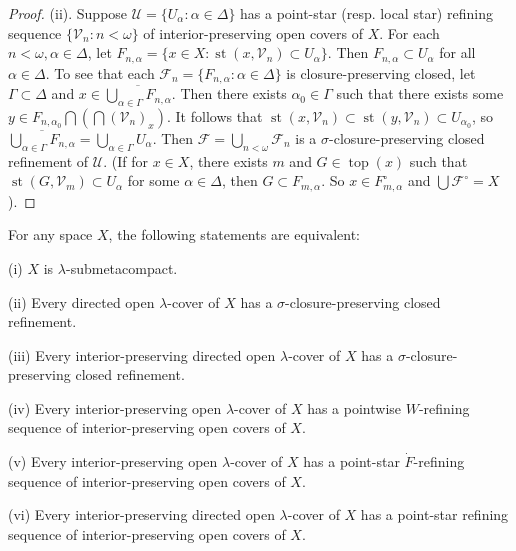 \documentclass[main.tex]{subfiles}
\begin{document}
\begin{proof}  
(ii). Suppose $\mathscr{U} = \{U_\alpha: \alpha \in \Delta\}$ has a point-star (resp. local star) refining 
sequence $\{\mathscr{V}_n: n < \omega\}$ of interior-preserving open covers of $X$. 
For each $n < \omega, \alpha \in \Delta$, let 
$F_{n,\alpha} = \{x \in X: \operatorname{st}(x, \mathscr{V}_n) \subset U_\alpha\}$. 
Then $F_{n,\alpha}\subset U_\alpha$ for all $\alpha \in \Delta$.
To see that each $\mathscr{F}_n = \{F_{n,\alpha}: \alpha \in \Delta\}$ is closure-preserving
 closed, let $\Gamma\subset\Delta$ and $x\in \overline{\bigcup_{\alpha\in\Gamma}F_{n, \alpha}}$.
Then there exists $\alpha_0\in\Gamma$ such that there exists some
$y\in F_{n,\alpha_0}\bigcap(\bigcap(\mathscr{V}_n)_x)$. It follows
that $\operatorname{st}(x, \mathscr{V}_n)\subset \operatorname{st}(y, \mathscr{V}_n)\subset U_{\alpha_0}$,
so $\overline{\bigcup_{\alpha\in\Gamma}F_{n, \alpha}} = \bigcup_{\alpha\in \Gamma}U_\alpha$.
 Then $\mathscr{F} = \bigcup_{n < \omega}\mathscr{F}_n$ is a $\sigma$-closure-preserving 
 closed refinement of $\mathscr{U}$.
 (If  for  $x \in X$, there exists $m$ and $G \in \operatorname{top}(x)$ such that 
 $\operatorname{st}(G, \mathscr{V}_m) \subset U_\alpha$ for some $\alpha\in\Delta$, 
 then $G\subset F_{m,\alpha}$. So $x\in F_{m, \alpha}^\circ$ and $\bigcup \mathscr{F}^\circ = X$).
\end{proof}

{\theorem{} \label{th:4.1.7}
For any space $X$, the following statements are equivalent:

\textup{(i)}  $X$ is $\lambda$-submetacompact.

\textup{(ii)}  Every directed open $\lambda$-cover of $X$ has a $\sigma$-closure-preserving 
closed refinement.

\textup{(iii)}  Every interior-preserving directed open $\lambda$-cover of $X$ has a $\sigma$-closure-preserving
closed refinement.

\textup{(iv)} Every interior-preserving open $\lambda$-cover of $X$ has a 
pointwise $W$-refining sequence of interior-preserving open covers of $X$.

\textup{(v)}  Every interior-preserving open $\lambda$-cover of $X$ has a point-star 
$\dot{F}$-refining sequence of interior-preserving open covers of $X$.

\textup{(vi)}  Every interior-preserving directed open $\lambda$-cover of $X$ has a point-star 
refining sequence of interior-preserving open covers of $X$.
}
\end{document}
